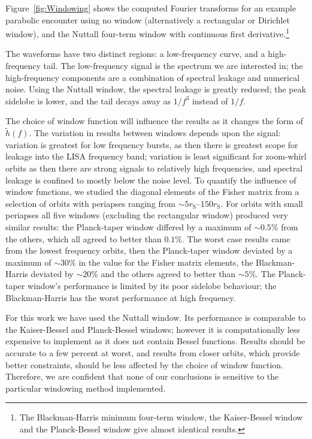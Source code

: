 \documentclass[useAMS,usedcolumn,usegraphicx,usenatbib]{mn2e}
\newcommand{\Figref}[1]{Figure~\ref{fig:#1}}
\newcommand{\sub}[1]{\ensuremath{_\mathrm{#1}}}
\begin{document}
\Figref{Windowing} shows the computed Fourier transforms for an example parabolic encounter using no window (alternatively a rectangular or Dirichlet window), and the Nuttall four-term window with continuous first derivative.\footnote{The Blackman-Harris minimum four-term window, the Kaiser-Bessel window and the Planck-Bessel window give almost identical results.}

The waveforms have two distinct regions: a low-frequency curve, and a high-frequency tail. The low-frequency signal is the spectrum we are interested in; the high-frequency components are a combination of spectral leakage and numerical noise. Using the Nuttall window, the spectral leakage is greatly reduced; the peak sidelobe is lower, and the tail decays away as $1/{f^3}$ instead of $1/{f}$.

The choice of window function will influence the results as it changes the form of $\widetilde{h}(f)$. The variation in results between windows depends upon the signal: variation is greatest for low frequency bursts, as then there is greatest scope for leakage into the LISA frequency band; variation is least significant for zoom-whirl orbits as then there are strong signals to relatively high frequencies, and spectral leakage is confined to mostly below the noise level. To quantify the influence of window functions, we studied the diagonal elements of the Fisher matrix from a selection of orbits with periapses ranging from $\sim 5 r\sub{S}$--$150 r\sub{S}$. For orbits with small periapses all five windows (excluding the rectangular window) produced very similar results: the Planck-taper window differed by a maximum of $\sim 0.5\%$ from the others, which all agreed to better than $0.1\%$. The worst case results came from the lowest frequency orbits, then the Planck-taper window deviated by a maximum of $\sim 30\%$ in the value for the Fisher matrix elements, the Blackman-Harris deviated by $\sim 20\%$ and the others agreed to better than $\sim 5\%$. The Planck-taper window's performance is limited by its poor sidelobe behaviour; the Blackman-Harris has the worst performance at high frequency.

For this work we have used the Nuttall window. Its performance is comparable to the Kaiser-Bessel and Planck-Bessel windows; however it is computationally less expensive to implement as it does not contain Bessel functions. Results should be accurate to a few percent at worst, and results from closer orbits, which provide better constraints, should be less affected by the choice of window function. Therefore, we are confident that none of our conclusions is sensitive to the particular windowing method implemented.

\bsp

\label{lastpage}
\end{document}
